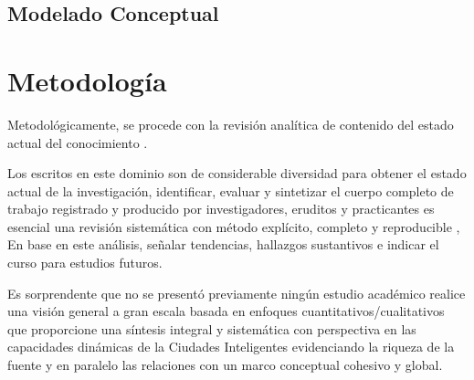 \documentclass[a4paper,fleqn,spanish]{cas-dc}
\begin{document}


\subsection{Modelado Conceptual}\label{afirmacion}


\section{Metodología}\label{metodo}

Metodológicamente, se procede con la revisión analítica de contenido del estado
actual del conocimiento \cite{kitchenham_guidelines_2007,
webster_analyzing_2002, Wolfswinkel2017}.


Los escritos en este dominio
son de considerable diversidad
para obtener el estado
actual de la investigación,
identificar, evaluar y sintetizar
el cuerpo completo de trabajo registrado y producido
por investigadores, eruditos y practicantes
es esencial
una revisión sistemática con método explícito, completo y reproducible
\cite{Okoli2015},
En base en este análisis,
señalar tendencias, hallazgos sustantivos
e indicar el curso para estudios futuros.

Es sorprendente que no se presentó previamente ningún estudio académico
realice una visión general a gran escala basada en enfoques
cuantitativos/cualitativos que proporcione una síntesis integral y sistemática
con perspectiva en las capacidades dinámicas de la Ciudades Inteligentes
evidenciando la riqueza de la fuente y en paralelo las relaciones con un
marco conceptual cohesivo y global.

 
\end{document}

